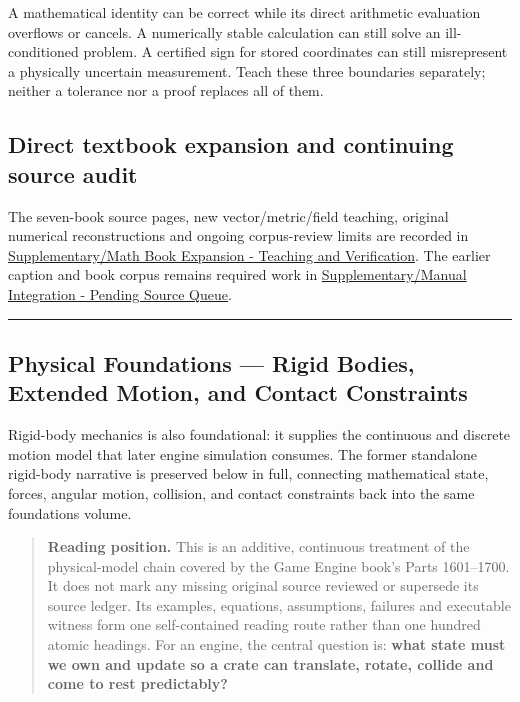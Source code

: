 A mathematical identity can be correct while its direct arithmetic evaluation overflows or cancels. A numerically stable calculation can still solve an ill-conditioned problem. A certified sign for stored coordinates can still misrepresent a physically uncertain measurement. Teach these three boundaries separately; neither a tolerance nor a proof replaces all of them.

\subsection{Direct textbook expansion and continuing source audit}\label{02-foundations-ii-ch039-direct-textbook-expansion-and-continuing-source-audit}

The seven-book source pages, new vector/metric/field teaching, original numerical reconstructions and ongoing corpus-review limits are recorded in \hyperref[appendix-5056f3debc1f]{Supplementary/Math Book Expansion - Teaching and Verification}. The earlier caption and book corpus remains required work in \hyperref[appendix-ac1f51db5e9a]{Supplementary/Manual Integration - Pending Source Queue}.

\begin{center}\rule{0.5\linewidth}{0.5pt}\end{center}

\subsection{Physical Foundations --- Rigid Bodies, Extended Motion, and Contact Constraints}\label{02-foundations-ii-ch039-physical-foundations-rigid-bodies-extended-motion-and-contact-constraints}

Rigid-body mechanics is also foundational: it supplies the continuous and discrete motion model that later engine simulation consumes. The former standalone rigid-body narrative is preserved below in full, connecting mathematical state, forces, angular motion, collision, and contact constraints back into the same foundations volume.

\begin{quote}
\textbf{Reading position.} This is an additive, continuous treatment of the physical-model chain covered by the Game Engine book's Parts 1601--1700. It does not mark any missing original source reviewed or supersede its source ledger. Its examples, equations, assumptions, failures and executable witness form one self-contained reading route rather than one hundred atomic headings. For an engine, the central question is: \textbf{what state must we own and update so a crate can translate, rotate, collide and come to rest predictably?}
\end{quote}

